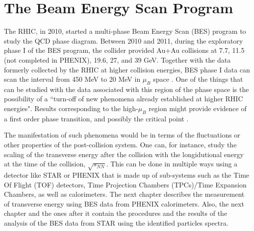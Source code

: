 \section{The Beam Energy Scan Program}
The RHIC, in 2010, started a multi-phase Beam Energy Scan (BES) program to study the QCD phase diagram. Between 2010 and 2011, during the exploratory phase I of the BES program, the collider provided Au+Au collisions at 7.7, 11.5 (not completed in PHENIX), 19.6, 27, and 39 GeV. Together with the data formerly collected by the RHIC at higher collision energies, BES phase I data can scan the interval from 450 MeV to 20 MeV in $\mu_{B}$ space \cite{1742-6596-455-1-012037, LUO201675}. One of the things that can be studied with the data associated with this region of the phase space is the possibility of a ``turn-off of new phenomena already established at higher RHIC energies"\cite{1742-6596-455-1-012037}. Results corresponding to the high-$\mu_{B}$ region might provide evidence of a first order phase transition, and possibly the critical point \cite{LUO201675}.

The manifestation of such phenomena would be in terms of the fluctuations or other properties of the post-collision system. One can, for instance, study the scaling of the transverse energy after the collision with the longidutional energy at the time of the collision, $\sqrt{s_{NN}}$. This can be done in multiple ways using a detector like STAR or PHENIX that is made up of sub-systems such as the Time Of Flight (TOF) detectors, Time Projection Chambers (TPCs)/Time Expansion Chambers, as well as calorimeters. The next chapter describes the measurement of transverse energy using BES data from PHENIX calorimeters. Also, the next chapter and the ones after it contain the procedures and the results of the analysis of the BES data from STAR using the identified particles spectra.

